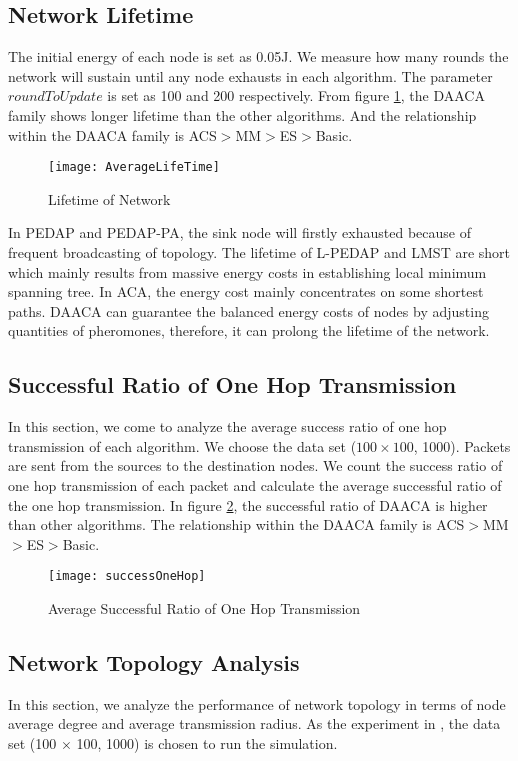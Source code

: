 \documentclass{elsarticle}
\begin{document}
\subsection{Network Lifetime} \label{NetworkLifetime}
The initial energy of each node is set as 0.05J. We measure how many rounds the network will sustain until any node exhausts in each algorithm. The parameter $roundToUpdate$ is set as 100 and 200 respectively. From figure \ref{figure7}, the DAACA family shows longer lifetime than the other algorithms. And the relationship within the DAACA family is ACS$ > $MM$ > $ES$ > $Basic.
\begin{figure}
\centering
\texttt{[image: AverageLifeTime]}\\
  \caption{Lifetime of Network}\label{figure7}
\end{figure}
In PEDAP and PEDAP-PA, the sink node will firstly exhausted because of frequent broadcasting of topology. The lifetime of L-PEDAP and LMST are short which mainly results from massive energy costs in establishing local minimum spanning tree. In ACA, the energy cost mainly concentrates on some shortest paths. DAACA can guarantee the balanced energy costs of nodes by adjusting quantities of pheromones, therefore, it can prolong the lifetime of the network.

\subsection{Successful Ratio of One Hop Transmission}
In this section, we come to analyze the average success ratio of one hop transmission of each algorithm. We choose the data set ($100\times 100$, 1000). Packets are sent from the sources to the destination nodes. We count the success ratio of one hop transmission of each packet and calculate the average successful ratio of the one hop transmission. In figure \ref{fig:success}, the successful ratio of DAACA is higher than other algorithms. The relationship within the DAACA family is ACS$>$MM$>$ES$>$Basic.

\begin{figure}
  \centering \texttt{[image: successOneHop]}\\
  \caption{Average Successful Ratio of One Hop Transmission}\label{fig:success}
\end{figure}



\subsection{Network Topology Analysis} \label{NetworkTopologyAnalysis}
In this section, we analyze the performance of network topology in terms of node average degree and average transmission radius. As the experiment in \cite{label-7}, the data set (100 $\times$ 100, 1000) is chosen to run the simulation.
\end{document}
